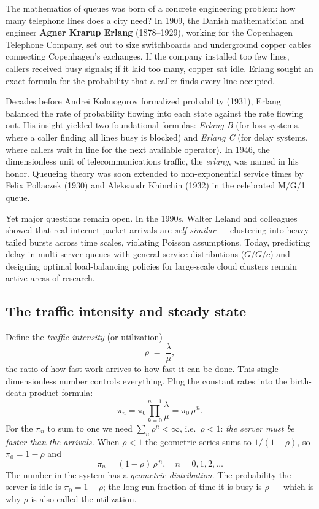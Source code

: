 \begin{historybox}
The mathematics of queues was born of a concrete engineering problem: how many telephone lines
does a city need? In 1909, the Danish mathematician and engineer \textbf{Agner Krarup Erlang}
(1878--1929), working for the Copenhagen Telephone Company, set out to size switchboards and
underground copper cables connecting Copenhagen's exchanges. If the company installed too few lines,
callers received busy signals; if it laid too many, copper sat idle. Erlang sought an exact formula
for the probability that a caller finds every line occupied.

Decades before Andrei Kolmogorov formalized probability (1931), Erlang balanced the rate of probability
flowing into each state against the rate flowing out. His insight yielded two foundational formulas:
\emph{Erlang B} (for loss systems, where a caller finding all lines busy is blocked) and \emph{Erlang C}
(for delay systems, where callers wait in line for the next available operator). In 1946, the
dimensionless unit of telecommunications traffic, the \emph{erlang}, was named in his honor.
Queueing theory was soon extended to non-exponential service times by Felix Pollaczek (1930) and
Aleksandr Khinchin (1932) in the celebrated M/G/1 queue.

Yet major questions remain open. In the 1990s, Walter Leland and colleagues showed that real internet
packet arrivals are \emph{self-similar} --- clustering into heavy-tailed bursts across time scales,
violating Poisson assumptions. Today, predicting delay in multi-server queues with general service
distributions ($G/G/c$) and designing optimal load-balancing policies for large-scale cloud clusters
remain active areas of research.
\end{historybox}

\subsection{The traffic intensity and steady state}

Define the \emph{traffic intensity} (or utilization)
\[
  \rho \;=\; \frac{\lambda}{\mu},
\]
the ratio of how fast work arrives to how fast it can be done. This single dimensionless number
controls everything. Plug the constant rates into the birth-death product formula:
\[
  \pi_n = \pi_0 \prod_{k=0}^{n-1}\frac{\lambda}{\mu} = \pi_0\, \rho^{\,n}.
\]
For the $\pi_n$ to sum to one we need $\sum_n \rho^n < \infty$, i.e.\ $\rho < 1$: \emph{the server
must be faster than the arrivals.} When $\rho < 1$ the geometric series sums to $1/(1-\rho)$, so
$\pi_0 = 1 - \rho$ and
\[
  \boxed{\,\pi_n = (1-\rho)\,\rho^{\,n}, \quad n = 0, 1, 2, \dots\,}
\]
The number in the system has a \emph{geometric distribution}. The probability the server is idle is
$\pi_0 = 1-\rho$; the long-run fraction of time it is busy is $\rho$ --- which is why $\rho$ is also
called the utilization.

